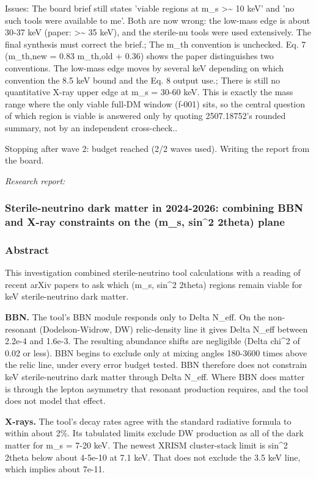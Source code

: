 \documentclass[11pt,a4paper]{article}
\begin{document}
Issues: The board brief still states 'viable regions at m\_s \textgreater{}\textasciitilde{} 10 keV' and 'no such tools were available to me'. Both are now wrong: the low-mass edge is about 30-37 keV (paper: \textgreater{}\textasciitilde{} 35 keV), and the sterile-nu tools were used extensively. The final synthesis must correct the brief.; The m\_th convention is unchecked. Eq. 7 (m\_th,new = 0.83 m\_th,old + 0.36) shows the paper distinguishes two conventions. The low-mass edge moves by several keV depending on which convention the 8.5 keV bound and the Eq. 8 output use.; There is still no quantitative X-ray upper edge at m\_s = 30-60 keV. This is exactly the mass range where the only viable full-DM window (f-001) sits, so the central question of which region is viable is answered only by quoting 2507.18752's rounded summary, not by an independent cross-check..

Stopping after wave 2: budget reached (2/2 waves used). Writing the report from the board.

\textit{Research report:}\par
\subsubsection*{Sterile-neutrino dark matter in 2024-2026: combining BBN and X-ray constraints on the (m\_s, sin\textasciicircum{}2 2theta) plane}
\subsubsection*{Abstract}
This investigation combined sterile-neutrino tool calculations with a reading of recent arXiv papers to ask which (m\_s, sin\textasciicircum{}2 2theta) regions remain viable for keV sterile-neutrino dark matter.

\textbf{BBN.} The tool's BBN module responds only to Delta N\_eff. On the non-resonant (Dodelson-Widrow, DW) relic-density line it gives Delta N\_eff between 2.2e-4 and 1.6e-3. The resulting abundance shifts are negligible (\textbar{}Delta chi\textasciicircum{}2\textbar{} of 0.02 or less). BBN begins to exclude only at mixing angles 180-3600 times above the relic line, under every error budget tested. BBN therefore does not constrain keV sterile-neutrino dark matter through Delta N\_eff. Where BBN does matter is through the lepton asymmetry that resonant production requires, and the tool does not model that effect.

\textbf{X-rays.} The tool's decay rates agree with the standard radiative formula to within about 2\%. Its tabulated limits exclude DW production as all of the dark matter for m\_s = 7-20 keV. The newest XRISM cluster-stack limit is sin\textasciicircum{}2 2theta below about 4-5e-10 at 7.1 keV. That does not exclude the 3.5 keV line, which implies about 7e-11.
\end{document}
